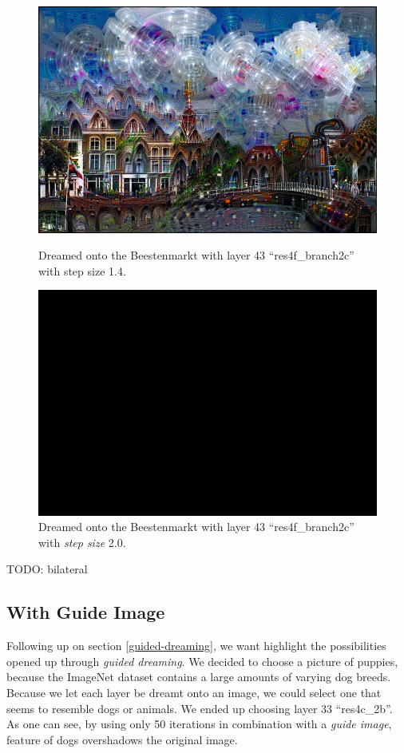 \begin{figure}[H]
	\centering
	\includegraphics[width=1\linewidth]{img/houses1.jpg}
	\caption{Dreamed onto the Beestenmarkt with layer 43 \enquote{res4f\_branch2c} with step size 1.4.}
	\label{fig:houses1}
	\endminipage\hfill
	\centering
	\includegraphics[width=1\linewidth]{img/houses2.jpg}
	\caption{Dreamed onto the Beestenmarkt with layer 43 \enquote{res4f\_branch2c} with \textit{step size} 2.0.}
	\label{fig:houses2}
	\endminipage\hfill
\end{figure}

TODO: bilateral


\subsection{With Guide Image}
\label{sec:withguide}
Following up on section \ref{guided-dreaming}, we want highlight the possibilities opened up through \textit{guided dreaming}.
We decided to choose a picture of puppies, because the ImageNet dataset contains a large amounts of varying dog breeds.
Because we let each layer be dreamt onto an image, we could select one that seems to resemble dogs or animals.
We ended up choosing layer 33 \enquote{res4c\_2b}.
As one can see, by using only 50 iterations in combination with a \textit{guide image}, feature of dogs overshadows the original image.

